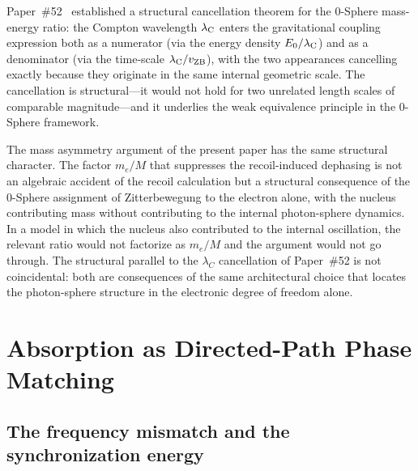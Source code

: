 \documentclass[%
 reprint, amsmath,amssymb, aps, prb, ]{revtex4-2}
\numberwithin{equation}{section}
\newcommand{\lambdaC}{\lambda_{\rm C}}
\begin{document}
Paper~\#52~\cite{hanamura52} established a structural cancellation theorem for the 0-Sphere mass-energy ratio: the Compton wavelength $\lambdaC$ enters the gravitational coupling expression both as a numerator (via the energy density $E_0/\lambdaC$) and as a denominator (via the time-scale $\lambdaC/v_{\rm ZB}$), with the two appearances cancelling exactly because they originate in the same internal geometric scale. The cancellation is structural---it would not hold for two unrelated length scales of comparable magnitude---and it underlies the weak equivalence principle in the 0-Sphere framework.

The mass asymmetry argument of the present paper has the same structural character. The factor $m_e/M$ that suppresses the recoil-induced dephasing is not an algebraic accident of the recoil calculation but a structural consequence of the 0-Sphere assignment of Zitterbewegung to the electron alone, with the nucleus contributing mass without contributing to the internal photon-sphere dynamics. In a model in which the nucleus also contributed to the internal oscillation, the relevant ratio would not factorize as $m_e/M$ and the argument would not go through. The structural parallel to the $\lambda_C$ cancellation of Paper~\#52 is not coincidental: both are consequences of the same architectural choice that locates the photon-sphere structure in the electronic degree of freedom alone.

\section{Absorption as Directed-Path Phase Matching}
\label{sec:absorption}

\subsection{The frequency mismatch and the synchronization energy}
\end{document}
